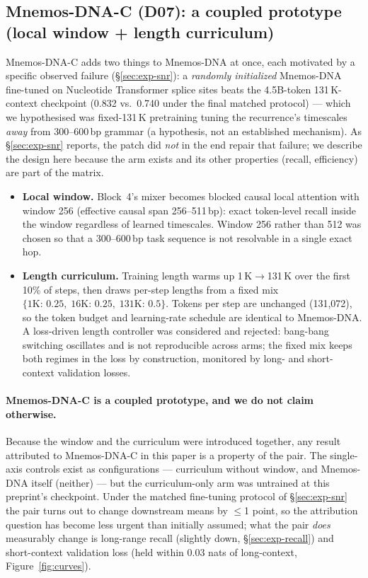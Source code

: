 \documentclass[11pt]{article}
\theoremstyle{plain}
\begin{document}
\subsection{Mnemos-DNA-C (D07): a coupled prototype (local window + length curriculum)}\label{sec:method-d07}

Mnemos-DNA-C adds two things to Mnemos-DNA at once, each motivated by a specific observed failure
(\S\ref{sec:exp-snr}): a \emph{randomly initialized} Mnemos-DNA fine-tuned on Nucleotide
Transformer splice sites beats the 4.5B-token 131\,K-context checkpoint (0.832 vs.\ 0.740 under
the final matched protocol) --- which we hypothesised was fixed-131\,K pretraining tuning the recurrence's
timescales \emph{away} from 300--600\,bp grammar (a hypothesis, not an established mechanism). As \S\ref{sec:exp-snr} reports, the patch did
\emph{not} in the end repair that failure; we describe the design here because the arm exists
and its other properties (recall, efficiency) are part of the matrix.

\begin{itemize}
\item \textbf{Local window.} Block~4's mixer becomes blocked causal local attention with window
256 (effective causal span 256--511\,bp): exact token-level recall inside the window regardless
of learned timescales. Window 256 rather than 512 was chosen so that a 300--600\,bp task sequence
is not resolvable in a single exact hop.
\item \textbf{Length curriculum.} Training length warms up 1\,K$\to$131\,K over the first 10\% of
steps, then draws per-step lengths from a fixed mix $\{1\text{K}{:}\,0.25,\;16\text{K}{:}\,0.25,\;
131\text{K}{:}\,0.5\}$. Tokens per step are unchanged (131{,}072), so the token budget and
learning-rate schedule are identical to Mnemos-DNA. A loss-driven length controller was considered and
rejected: bang-bang switching oscillates and is not reproducible across arms; the fixed mix keeps
both regimes in the loss by construction, monitored by long- and short-context validation losses.
\end{itemize}

\paragraph{Mnemos-DNA-C is a coupled prototype, and we do not claim otherwise.} Because the window and the
curriculum were introduced together, any result attributed to Mnemos-DNA-C in this paper is a
property of the pair. The single-axis controls exist as configurations --- curriculum without
window, and Mnemos-DNA itself (neither) --- but the curriculum-only arm was untrained at this
preprint's checkpoint. Under the matched fine-tuning protocol of \S\ref{sec:exp-snr} the pair
turns out to change downstream means by $\le$1 point, so the attribution question has become
less urgent than initially assumed; what the pair \emph{does} measurably change is
long-range recall (slightly down, \S\ref{sec:exp-recall}) and short-context validation loss
(held within 0.03 nats of long-context, Figure~\ref{fig:curves}).
\end{document}
